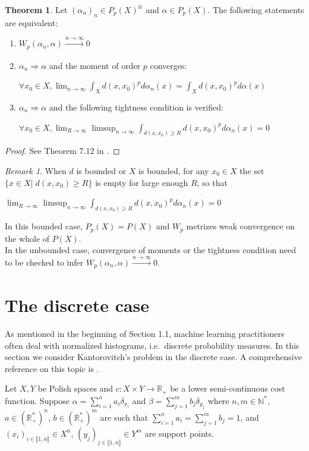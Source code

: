\documentclass[12pt]{report}
\theoremstyle{definition}
\newtheorem{thm}[defi]{Theorem}
\theoremstyle{remark}
\newtheorem{rem}[defi]{Remark}
\begin{document}
\begin{thm}
 	Let $(\alpha_n)_n\in P_p(X)^{\mathbb N}$ and $\alpha \in P_p(X)$. The following statements are equivalent:
 	\begin{enumerate}[nosep]
 		\item $W_p(\alpha_n, \alpha) \xrightarrow[]{n\to \infty} 0$
 		\item $\alpha_n \Rightarrow \alpha$ and the moment of order $p$ converges: \begin{center}$\displaystyle \forall x_0\in X, \lim_{n\to \infty} \int_X d(x,x_0)^p d\alpha_n(x) =  \int_X d(x,x_0)^p d\alpha(x)$\end{center}
 		\item $\alpha_n \Rightarrow \alpha$ and the following tightness condition is verified: \begin{center}$\displaystyle \forall x_0\in X, \lim_{R\to \infty} \limsup_{n\to \infty} \int_{d(x,x_0)\geq R} d(x,x_0)^p d\alpha_n(x) = 0$\end{center}
 	\end{enumerate}
\end{thm}

\hfill
\begin{proof}
	See Theorem 7.12 in \cite{villani2003topics}.
\end{proof}


\begin{rem}
	When $d$ is bounded or $X$ is bounded, for any $x_0\in X$ the set \\$\{x\in X|\; d(x,x_0)\geq R\}$ is empty for large enough $R$, so that \begin{center}$\displaystyle  \lim_{R\to \infty} \limsup_{n\to \infty} \int_{d(x,x_0)\geq R} d(x,x_0)^p d\alpha_n(x) = 0$\end{center}
	In this bounded case, $P_p(X)=P(X)$ and $W_p$ metrizes weak convergence on the whole of $P(X)$.\\
	In the unbounded case, convergence of moments or the tightness condition need to be checked to infer $W_p(\alpha_n, \alpha) \xrightarrow[]{n\to \infty} 0$.
\end{rem}

\newpage
\section{The discrete case}

\hspace{\parindent} As mentioned in the beginning of Section 1.1, machine learning practitioners often deal with normalized histograms, i.e.\ discrete probability measures. In this section we consider Kantorovitch's problem in the discrete case. A comprehensive reference on this topic is \cite[Chapter~2]{peyre2019computational}.
\\
\par Let $X,Y$ be Polish spaces and $c:X\times Y \to \mathbb R_+$ be a lower semi-continuous cost function. Suppose $\alpha=\sum_{i=1}^n a_i \delta_{x_i}$ and $\beta=\sum_{j=1}^m b_j \delta_{y_j}$ where $n,m\in \mathbb N^*$, $a\in (\mathbb R_+^*)^n$, $b\in (\mathbb R_+^*)^m$ are such that $\sum_{i=1}^n a_i=\sum_{j=1}^m b_j=1$, and $(x_i)_{i\in \llbracket 1,n\rrbracket} \in X^n$, $(y_j)_{j\in \llbracket 1,n\rrbracket} \in Y^m$ are support points. 
\end{document}
